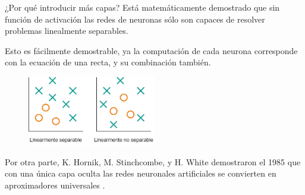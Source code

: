 \begin{frame}{¿Por qué introducir más capas?}
Está matemáticamente \alert{demostrado} que sin función de activación las redes de neuronas sólo son capaces de resolver problemas \alert{linealmente separables}.

Esto es fácilmente demostrable, ya la computación de cada neurona corresponde con la ecuación de \alert{una recta}, y su combinación también.

\begin{figure}
\centering
    \includegraphics[width=0.5\textwidth]{Slides/figures/Tema 1/Separabilidad_Lineal.png}
\end{figure}

Por otra parte, K. Hornik, M. Stinchcombe, y H. White demostraron el 1985 que con \alert{una única capa oculta} las redes neuronales artificiales se convierten en aproximadores universales \cite{hornik1989multilayer}.
\end{frame}


